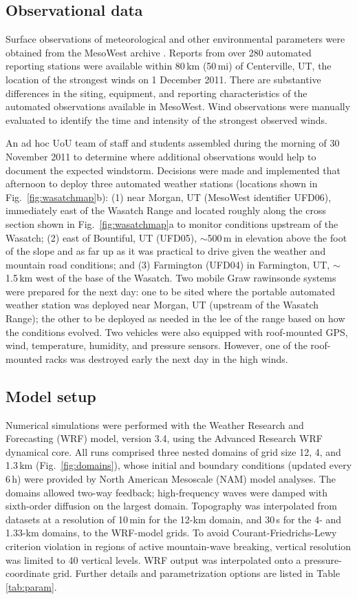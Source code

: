 \documentclass[pdftex,12pt]{article}
\def\MW{\mbox{MesoWest}} %
\def\around{$\sim$}
\begin{document}
\subsection{Observational data}

Surface observations of meteorological and other environmental parameters were obtained from the \MW{} archive \citep{Horel2002}. Reports from over 280 automated reporting stations were available within 80\,km (50\,mi) of Centerville, UT, the location of the strongest winds on 1 December 2011. There are substantive differences in the siting, equipment, and reporting characteristics of the automated observations available in \MW. Wind observations were manually evaluated to identify the time and intensity of the strongest observed winds.

An ad hoc UoU team of staff and students assembled during the morning of 30 November 2011 to determine where additional observations would help to document the expected windstorm. Decisions were made and implemented that afternoon to deploy three automated weather stations (locations shown in Fig.~\ref{fig:wasatchmap}b): (1) near Morgan, UT (\MW{} identifier UFD06), immediately east of the Wasatch Range and located roughly along the cross section shown in Fig.~\ref{fig:wasatchmap}a to monitor conditions upstream of the Wasatch; (2) east of Bountiful, UT (UFD05), \around 500\,m in elevation above the foot of the slope and as far up as it was practical to drive given the weather and mountain road conditions; and (3) Farmington (UFD04) in Farmington, UT, \around 1.5\,km west of the base of the Wasatch. Two mobile Graw rawinsonde systems were prepared for the next day: one to be sited where the portable automated weather station was deployed near Morgan, UT (upstream of the Wasatch Range); the other to be deployed as needed in the lee of the range based on how the conditions evolved. Two vehicles were also equipped with roof-mounted GPS, wind, temperature, humidity, and pressure sensors. However, one of the roof-mounted racks was destroyed early the next day in the high winds.

\subsection{Model setup}
Numerical simulations were performed with the Weather Research and Forecasting (WRF) model, version 3.4, using the Advanced Research WRF dynamical core. All runs comprised three nested domains of grid size 12, 4, and 1.3\,km (Fig.~\ref{fig:domains}), whose initial and boundary conditions (updated every 6\,h) were provided by North American Mesoscale (NAM) model analyses. The domains allowed two-way feedback; high-frequency waves were damped with sixth-order diffusion on the largest domain. Topography was interpolated from datasets at a resolution of 10\,min for the 12-km domain, and 30\,s for the 4- and 1.33-km domains, to the WRF-model grids. To avoid Courant-Friedrichs-Lewy criterion violation in regions of active mountain-wave breaking, vertical resolution was limited to 40 vertical levels. WRF output was interpolated onto a pressure-coordinate grid. Further details and parametrization options are listed in Table \ref{tab:param}.
\end{document}
